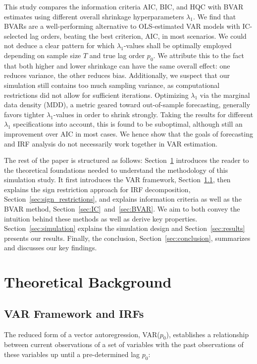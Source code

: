 \documentclass[12pt, a4paper]{article}
\begin{document}
This study compares the information criteria AIC, BIC, and HQC with BVAR estimates using different overall shrinkage hyperparameters $\lambda_1$. We find that BVARs are a well-performing alternative to OLS-estimated VAR models with IC-selected lag orders, beating the best criterion, AIC, in most scenarios. We could not deduce a clear pattern for which $\lambda_1$-values shall be optimally employed depending on sample size $T$ and true lag order $p_0$. We attribute this to the fact that both higher and lower shrinkage can have the same overall effect: one reduces variance, the other reduces bias. Additionally, we suspect that our simulation still contains too much sampling variance, as computational restrictions did not allow for sufficient iterations. Optimizing $\lambda_1$ via the marginal data density (MDD), a metric geared toward out-of-sample forecasting, generally favors tighter $\lambda_1$-values in order to shrink strongly. Taking the results for different $\lambda_1$ specifications into account, this is found to be suboptimal, although still an improvement over AIC in most cases. We hence show that the goals of forecasting and IRF analysis do not necessarily work together in VAR estimation.

The rest of the paper is structured as follows: Section~\ref{sec:theory} introduces the reader to the theoretical foundations needed to understand the methodology of this simulation study. It first introduces the VAR framework, Section~\ref{sec:VAR_IRF}, then explains the sign restriction approach for IRF decomposition, Section~\ref{sec:sign_restrictions}, and explains information criteria as well as the BVAR method, Section~\ref{sec:IC}~and~\ref{sec:BVAR}. We aim to both convey the intuition behind these methods as well as derive key properties. Section~\ref{sec:simulation} explains the simulation design and Section~\ref{sec:results} presents our results. Finally, the conclusion, Section~\ref{sec:conclusion}, summarizes and discusses our key findings.

\section{Theoretical Background}
\label{sec:theory}
 
\subsection{VAR Framework and IRFs}
\label{sec:VAR_IRF}

The reduced form of a vector autoregression, VAR($p_0$), establishes a relationship between current observations of a set of variables with the past observations of these variables up until a pre-determined lag $p_0$:
\end{document}
